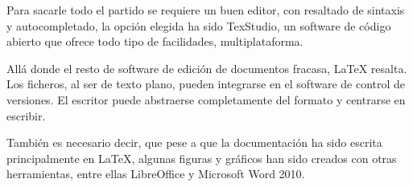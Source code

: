 Para sacarle todo el partido se requiere un buen editor, con resaltado de sintaxis y autocompletado, 
la opci\'on elegida ha sido TexStudio, un
software de c\'{o}digo abierto que ofrece todo tipo de facilidades, multiplataforma.

All\'a donde el resto de software de edici\'on de documentos 
fracasa, LaTeX resalta. Los ficheros, al ser de texto plano,
pueden integrarse en el software de control de versiones. El escritor puede abstraerse 
completamente del formato
y centrarse en escribir.

Tambi\'en es necesario decir, que pese a que la documentaci\'on ha sido escrita principalmente 
en LaTeX, algunas figuras
y gr\'aficos han sido creados con otras herramientas, entre ellas LibreOffice y Microsoft Word 
2010.
